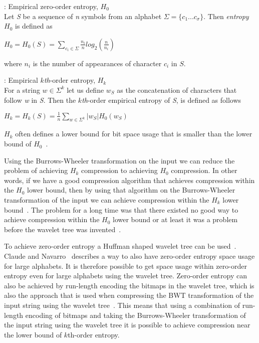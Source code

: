 \begin{mdframed}[nobreak, linecolor=lightgray, linewidth=2pt]
\begin{definition}: Empirical zero-order entropy, $H_0$ \\
Let \textit{S} be a sequence of \textit{n} symbols from an alphabet $\Sigma = \lbrace c_1 ... c_\sigma \rbrace$.
Then \textit{entropy} $H_0$ is defined as
\begin{center}
$H_0 = H_0(S) = \sum\limits_{c_i \in \Sigma} \frac{n_i}{n} log_2(\frac{n}{n_i})$
\end{center}
where $n_i$ is the number of appearances of character $c_i$ in $S$.
\end{definition}
\begin{definition}: Empirical $k$\emph{th}-order entropy, $H_k$ \\
For a string $w \in \Sigma^k$ let us define $w_S$ as the concatenation of characters that follow \textit{w} in \textit{S}. 
Then the $k$\emph{th}-order empirical entropy of \textit{S}, is defined as follows
\begin{center}
$H_k = H_k(S) = \frac{1}{n} \sum\limits_{w \in \Sigma^k} | w_S |H_0(w_S)$
\end{center}
\end{definition}
\end{mdframed}
$H_k$ often defines a lower bound for bit space usage that is smaller than the lower bound of $H_0$~.

Using the Burrows-Wheeler transformation on the input we can reduce the problem of achieving $H_k$ compression to achieving $H_0$ compression.
In other words, if we have a good compression algorithm that achieves compression within the $H_0$ lower bound, then by using that algorithm on the Burrows-Wheeler transformation of the input we can achieve compression within the $H_k$ lower bound~.
The problem for a long time was that there existed no good way to achieve compression within the $H_0$ lower bound or at least it was a problem before the wavelet tree was invented~.

To achieve zero-order entropy a Huffman shaped wavelet tree can be used~. Claude and Navarro~ describes a way to also have zero-order entropy space usage for large alphabets. 
It is therefore possible to get space usage within zero-order entropy even for large alphabets using the wavelet tree. 
Zero-order entropy can also be achieved by run-length encoding the bitmaps in the wavelet tree, which is also the approach that is used when compressing the BWT transformation of the input string using the wavelet tree~.
This means that using a combination of run-length encoding of bitmaps and taking the Burrows-Wheeler transformation of the input string using the wavelet tree it is possible to achieve compression near the lower bound of $k$th-order entropy.

